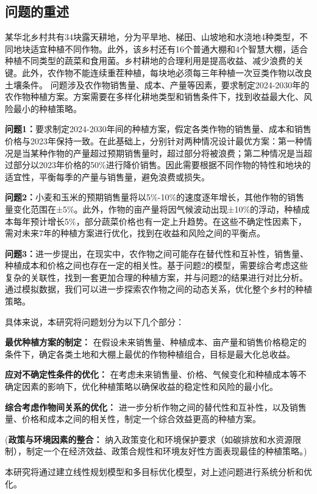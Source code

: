 \documentclass{cumcmthesis}
\begin{document}
\subsection{问题的重述}
某华北乡村共有34块露天耕地，分为平旱地、梯田、山坡地和水浇地4种类型，不同地块适宜种植不同作物。此外，该乡村还有16个普通大棚和4个智慧大棚，适合种植不同类型的蔬菜和食用菌。乡村耕地的合理利用是提高收益、减少浪费的关键。此外，农作物不能连续重茬种植，每块地必须每三年种植一次豆类作物以改良土壤条件。
问题涉及农作物销售量、成本、产量等因素，要求制定2024-2030年的农作物种植方案。方案需要在多样化耕地类型和销售条件下，找到收益最大化、风险最小的种植策略。

\textbf{问题1：}要求制定2024-2030年间的种植方案，假定各类作物的销售量、成本和销售价格与2023年保持一致。在此基础上，分别针对两种情况设计最优方案：第一种情况是当某种作物的产量超过预期销售量时，超过部分将被浪费；第二种情况是当超过部分以2023年价格的50\%进行降价销售。因此需要根据不同作物的特性和地块的适宜性，平衡每季的产量与销售量，避免浪费或损失。

\textbf{问题2：}小麦和玉米的预期销售量将以5\%-10\%的速度逐年增长，其他作物的销售量变化范围在±5\%。此外，作物的亩产量将因气候波动出现±10\%的浮动，种植成本每年预计增长5\%，部分蔬菜价格也有一定上升趋势。在这些不确定性因素下，需对未来7年的种植方案进行优化，找到在收益和风险之间的平衡点。

\textbf{问题3：}进一步提出，在现实中，农作物之间可能存在替代性和互补性，销售量、种植成本和价格之间也存在一定的相关性。基于问题2的模型，需要综合考虑这些复杂的关联性，找到一套更加合理的种植方案，并与问题2的结果进行对比分析。通过模拟数据，我们可以进一步探索农作物之间的动态关系，优化整个乡村的种植策略。

具体来说，本研究将问题划分为以下几个部分：

\textbf{最优种植方案的制定：} 在假设未来销售量、种植成本、亩产量和销售价格稳定的条件下，确定各类土地和大棚上最优的作物种植组合，目标是最大化总收益。

\textbf{应对不确定性条件的优化：} 在考虑未来销售量、价格、气候变化和种植成本等不确定因素的影响下，优化种植策略以确保收益的稳定性和风险的最小化。

\textbf{综合考虑作物间关系的优化：} 进一步分析作物之间的替代性和互补性，以及销售量、价格和成本之间的相关性，制定一个综合效益更高的种植方案。

(\textbf{政策与环境因素的整合：} 纳入政策变化和环境保护要求（如碳排放和水资源限制），制定一个在经济效益、政策合规性和环境友好性方面表现最佳的种植策略。)

本研究将通过建立线性规划模型和多目标优化模型，对上述问题进行系统分析和优化。
\end{document}
